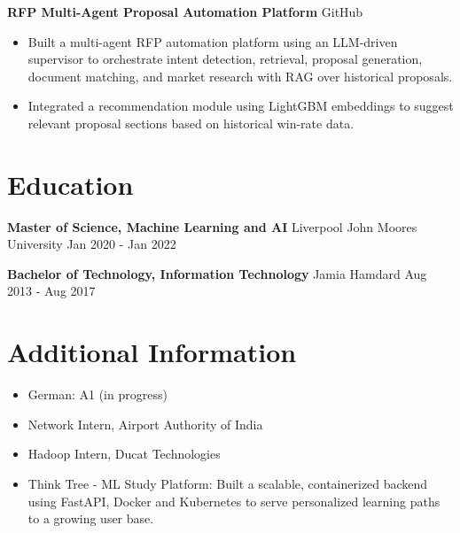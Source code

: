 \documentclass[10pt,a4paper]{article}
\begin{document}
\textbf{RFP Multi-Agent Proposal Automation Platform} \textbar{} GitHub\par
\begin{itemize}
  \item Built a multi-agent RFP automation platform using an LLM-driven supervisor to orchestrate intent detection, retrieval, proposal generation, document matching, and market research with RAG over historical proposals.
  \item Integrated a recommendation module using LightGBM embeddings to suggest relevant proposal sections based on historical win-rate data.
\end{itemize}

\section{Education}
\textbf{Master of Science, Machine Learning and AI} \textbar{} Liverpool John Moores University \hfill Jan 2020 - Jan 2022\par
\textbf{Bachelor of Technology, Information Technology} \textbar{} Jamia Hamdard \hfill Aug 2013 - Aug 2017\par

\section{Additional Information}
\begin{itemize}
  \item German: A1 (in progress)
  \item Network Intern, Airport Authority of India
  \item Hadoop Intern, Ducat Technologies
  \item Think Tree - ML Study Platform: Built a scalable, containerized backend using FastAPI, Docker and Kubernetes to serve personalized learning paths to a growing user base.
\end{itemize}
\end{document}
